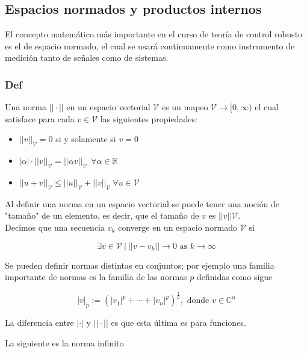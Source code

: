 \subsection{Espacios normados y productos internos}

El concepto matemático más importante en el curso de teoría de control robusto es el de espacio normado, el cual se usará continuamente como instrumento de medición tanto de señales como de sistemas.

\subsubsection{Def} Una norma $||\cdot||$ en un espacio vectorial $\mathcal{V}$ es un mapeo $\mathcal{V} \to [ 0,\infty)$ el cual satisface para cada $v \in \mathcal{V}$ las siguientes propiedades:

\begin{itemize}
    \item $|| v ||_{\mathcal{V}} = 0$ si y solamente si $v=0$
    \item $|\alpha| \cdot ||v||_{\mathcal{V}} = ||\alpha v||_{\mathcal{V}} \ \ \forall \alpha \in \mathbb{R}$
    \item $ ||u+v||_{\mathcal{V}} \leq ||u||_{\mathcal{V}} + ||v||_{\mathcal{V}} \ \forall u \in \mathcal{V}$
\end{itemize}

Al definir una norma en un espacio vectorial se puede tener una noción de "tamaño" de un elemento, es decir, que el tamaño de $v$ es $||v||\mathcal{V}$. \\

Decimos que una secuencia $v_k$ converge en un espacio normado $\mathcal{V}$ si

\begin{equation*}
    \exists v \in \mathcal{V} \ | \ ||v-v_k|| \to 0 \text{ as } k \to \infty
\end{equation*}

Se pueden definir normas distintas en conjuntos; por ejemplo una familia importante de normas es la familia de las normas $p$ definidas como sigue

\begin{equation*}
    |v|_p := (|v_1|^{p} + \cdots + |v_n|^{p})^{\frac{1}{p}}, \text{ donde } v \in \mathbb{C}^n
\end{equation*}

La diferencia entre $|\cdot|$ y $||\cdot||$ es que esta última es para funciones.

La siguiente es la norma infinito

